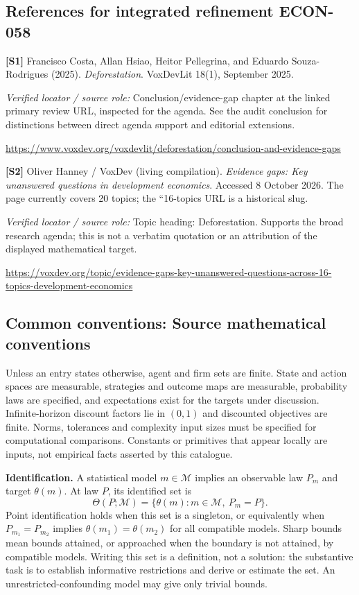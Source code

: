 \documentclass[11pt,a4paper]{article}
\begin{document}
\subsection*{References for integrated refinement ECON-058}
{\footnotesize\raggedright
\par\noindent\textbf{[S1]} Francisco Costa, Allan Hsiao, Heitor Pellegrina, and Eduardo Souza-Rodrigues (2025). \emph{Deforestation}. VoxDevLit 18(1), September 2025.\par \textit{Verified locator / source role:} Conclusion/evidence-gap chapter at the linked primary review URL, inspected for the agenda. See the audit conclusion for distinctions between direct agenda support and editorial extensions.\par \url{https://www.voxdev.org/voxdevlit/deforestation/conclusion-and-evidence-gaps}\par\smallskip
\par\noindent\textbf{[S2]} Oliver Hanney / VoxDev (living compilation). \emph{Evidence gaps: Key unanswered questions in development economics}. Accessed 8 October 2026. The page currently covers 20 topics; the ``16-topics URL is a historical slug.\par \textit{Verified locator / source role:} Topic heading: Deforestation. Supports the broad research agenda; this is not a verbatim quotation or an attribution of the displayed mathematical target.\par \url{https://voxdev.org/topic/evidence-gaps-key-unanswered-questions-across-16-topics-development-economics}\par\smallskip
}

\subsection*{Common conventions: Source mathematical conventions}

Unless an entry states otherwise, agent and firm sets are finite. State and action spaces are measurable, strategies and outcome maps are measurable, probability laws are specified, and expectations exist for the targets under discussion. Infinite-horizon discount factors lie in $(0,1)$ and discounted objectives are finite. Norms, tolerances and complexity input sizes must be specified for computational comparisons. Constants or primitives that appear locally are inputs, not empirical facts asserted by this catalogue.

\textbf{Identification.} A statistical model $m\in\mathcal M$ implies an observable law $P_m$ and target $\theta(m)$. At law $P$, its identified set is
\[
\Theta(P;\mathcal M)=\{\theta(m):m\in\mathcal M,\ P_m=P\}.
\]
Point identification holds when this set is a singleton, or equivalently when $P_{m_1}=P_{m_2}$ implies $\theta(m_1)=\theta(m_2)$ for all compatible models. Sharp bounds mean bounds attained, or approached when the boundary is not attained, by compatible models. Writing this set is a definition, not a solution: the substantive task is to establish informative restrictions and derive or estimate the set. An unrestricted-confounding model may give only trivial bounds.
\end{document}
